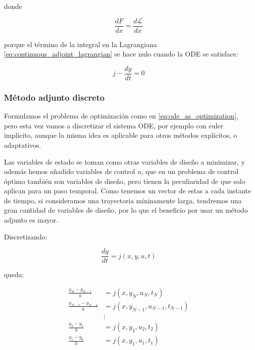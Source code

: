 donde

\begin{equation}
	\frac{dF}{d x} = \frac{d \mathcal{L}}{d x}
\end{equation}

porque el término de la integral en la Lagrangiana
\eqref{eq:continuous_adjoint_lagrangian} se hace nulo cuando la ODE se
satisface:

\begin{equation}
	j - \frac{dy}{dt} = 0
\end{equation}


\subsubsection{Método adjunto discreto}

Formulamos el problema de optimización como en \ref{eq:ode_as_optimization},
pero esta vez vamos a discretizar el sistema ODE, por ejemplo con euler
implícito, aunque la misma idea es aplicable para otros métodos explícitos, o
adaptativos.

Las variables de estado se toman como otras variables de diseño a minimizar, y
además hemos añadido variables de control $u$, que en un problema de control
óptimo también son variables de diseño, pero tienen la peculiaridad de que solo
aplican para un paso temporal. Como tenemos un vector de estas a cada instante
de tiempo, si consideramos una trayectoria míninamente larga, tendremos una
gran cantidad de variables de diseño, por lo que el beneficio por usar un
método adjunto es mayor.

Discretizando:

\begin{equation}
	\frac{dy}{dt} = j(x, y, u, t)
\end{equation}

queda:

\begin{align}
	\frac{y_N - y_{N-1}}{h}     & = j(x, y_N, u_N, t_N) \nonumber             \\
	\frac{y_{N-1} - y_{N-2}}{h} & = j(x, y_{N-1}, u_{N-1}, t_{N-1}) \nonumber \\
	                            & \vdots \nonumber                            \\
	\frac{y_{2} - y_{1}}{h}     & = j(x, y_{2}, u_{2}, t_{2}) \nonumber       \\
	\frac{y_{1} - y_{0}}{h}     & = j(x, y_{1}, u_{1}, t_{1})                 \\
\end{align}



